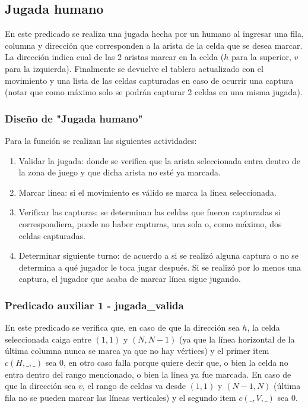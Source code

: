 \documentclass[12pt]{article} %
\begin{document}
		\subsection{Jugada humano}
		En este predicado se realiza una jugada hecha por un humano al ingresar una fila, columna y dirección que corresponden a la arista de la celda que se desea marcar. La dirección indica cual de las 2 aristas marcar en la celda ($h$ para la superior, $v$ para la izquierda). Finalmente se devuelve el tablero actualizado con el movimiento y una lista de las celdas capturadas en caso de ocurrir una captura (notar que como máximo solo se podrán capturar 2 celdas en una misma jugada).
		
			\subsubsection{Diseño de "Jugada humano"}
			Para la función se realizan las siguientes actividades:
			\begin{enumerate}
				\item Validar la jugada: donde se verifica que la arista seleccionada entra dentro de la zona de juego y que dicha arista no esté ya marcada.
				\item Marcar línea: si el movimiento es válido se marca la línea seleccionada.
				\item Verificar las capturas: se determinan las celdas que fueron capturadas si correspondiera, puede no haber capturas, una sola o, como máximo, dos celdas capturadas.
				\item Determinar siguiente turno: de acuerdo a si se realizó alguna captura o no se determina a qué jugador le toca jugar después. Si se realizó por lo menos una captura, el jugador que acaba de marcar línea sigue jugando.
			\end{enumerate}
			
			\subsubsection{Predicado auxiliar 1 - jugada\_valida}
			En este predicado se verifica que, en caso de que la dirección sea $h$, la celda seleccionada caiga entre $(1,1)$ y $(N, N-1)$ (ya que la línea horizontal de la última columna nunca se marca ya que no hay vértices) y el primer item $c(H,\_,\_)$ sea 0, en otro caso falla porque quiere decir que, o bien la celda no entra dentro del rango mencionado, o bien la línea ya fue marcada. En caso de que la dirección sea $v$, el rango de celdas va desde $(1,1)$ y $(N-1,N)$ (última fila no se pueden marcar las líneas verticales) y el segundo item $c(\_,V,\_)$ sea 0.
			
\end{document}
